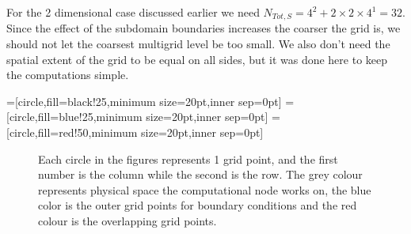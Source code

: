 		For the 2 dimensional case discussed earlier we need \( N_{Tot,S} = 4^2 + 2\times2\times4^1 = 32\).
		Since the effect of the subdomain boundaries increases the coarser the grid is,
		we should not let the coarsest multigrid level be too small. We also don't need
		the spatial extent of the grid to be equal on all sides, but it was done here
		to keep the computations simple.

	=[circle,fill=black!25,minimum size=20pt,inner sep=0pt]
	=[circle,fill=blue!25,minimum size=20pt,inner sep=0pt]
	=[circle,fill=red!50,minimum size=20pt,inner sep=0pt]

	\begin{figure}
		\centering
			
		\caption{Each circle in the figures represents 1 grid point, and the first number is the column while the second is the row. The grey colour represents physical space the computational node works on, the blue color is the outer grid points for boundary conditions and the red colour is the overlapping grid points.}
		\label{fig:domain_part}
    \end{figure}
